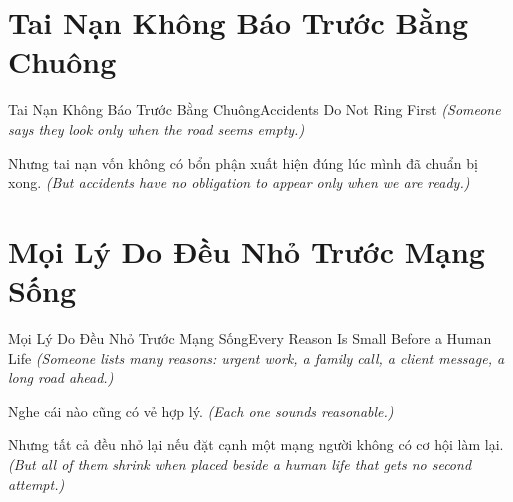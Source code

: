 \section{Tai Nạn Không Báo Trước Bằng Chuông}
\begin{truyen}{Tai Nạn Không Báo Trước Bằng Chuông}{Accidents Do Not Ring First}
\textit{(Someone says they look only when the road seems empty.)}

Nhưng tai nạn vốn không có bổn phận xuất hiện đúng lúc mình đã chuẩn bị xong.
\textit{(But accidents have no obligation to appear only when we are ready.)}

\end{truyen}

\section{Mọi Lý Do Đều Nhỏ Trước Mạng Sống}
\begin{truyen}{Mọi Lý Do Đều Nhỏ Trước Mạng Sống}{Every Reason Is Small Before a Human Life}
\textit{(Someone lists many reasons: urgent work, a family call, a client message, a long road ahead.)}

Nghe cái nào cũng có vẻ hợp lý.
\textit{(Each one sounds reasonable.)}

Nhưng tất cả đều nhỏ lại nếu đặt cạnh một mạng người không có cơ hội làm lại.
\textit{(But all of them shrink when placed beside a human life that gets no second attempt.)}

\end{truyen}


